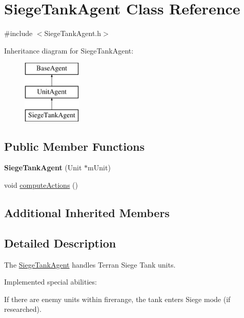 \hypertarget{class_siege_tank_agent}{\section{Siege\-Tank\-Agent Class Reference}
\label{class_siege_tank_agent}
}


{\ttfamily \#include $<$Siege\-Tank\-Agent.\-h$>$}

Inheritance diagram for Siege\-Tank\-Agent\-:\begin{figure}[H]
\begin{center}
\leavevmode
\includegraphics[height=3.000000cm]{class_siege_tank_agent}
\end{center}
\end{figure}
\subsection*{Public Member Functions}
\begin{DoxyCompactItemize}
\item 
\hypertarget{class_siege_tank_agent_a0d5c3b87b40af6b99c8b5b76bb4fb89d}{{\bfseries Siege\-Tank\-Agent} (Unit $\ast$m\-Unit)}\label{class_siege_tank_agent_a0d5c3b87b40af6b99c8b5b76bb4fb89d}

\item 
void \hyperlink{class_siege_tank_agent_adc0c1111bcbc5c5a5aff2ce66cfb2a3d}{compute\-Actions} ()
\end{DoxyCompactItemize}
\subsection*{Additional Inherited Members}


\subsection{Detailed Description}
The \hyperlink{class_siege_tank_agent}{Siege\-Tank\-Agent} handles Terran Siege Tank units.

Implemented special abilities\-:
\begin{DoxyItemize}
\item If there are enemy units within firerange, the tank enters Siege mode (if researched).
\end{DoxyItemize}

